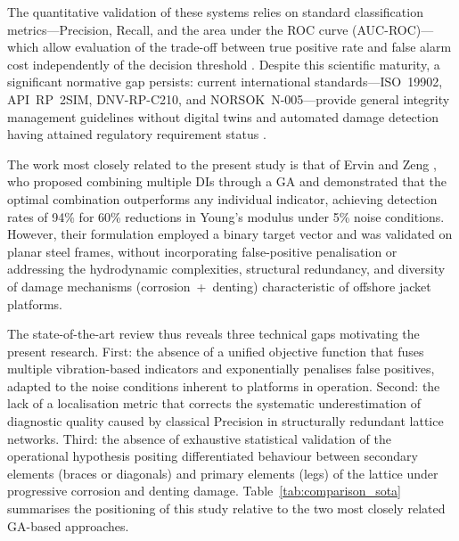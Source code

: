 \documentclass[preprint,12pt]{elsarticle}
\begin{document}
The quantitative validation of these systems relies on standard classification metrics---Precision, Recall, and the area under the ROC curve (AUC-ROC)---which allow evaluation of the trade-off between true positive rate and false alarm cost independently of the decision threshold \citep{li2024reliability}. Despite this scientific maturity, a significant normative gap persists: current international standards---ISO~19902, API~RP~2SIM, DNV-RP-C210, and NORSOK~N-005---provide general integrity management guidelines without digital twins and automated damage detection having attained regulatory requirement status \citep{ramboll2022digital}.

The work most closely related to the present study is that of Ervin and Zeng \citep{ervin2022index}, who proposed combining multiple DIs through a GA and demonstrated that the optimal combination outperforms any individual indicator, achieving detection rates of 94\% for 60\% reductions in Young's modulus under 5\% noise conditions. However, their formulation employed a binary target vector and was validated on planar steel frames, without incorporating false-positive penalisation or addressing the hydrodynamic complexities, structural redundancy, and diversity of damage mechanisms (corrosion~+~denting) characteristic of offshore jacket platforms.

The state-of-the-art review thus reveals three technical gaps motivating the present research. First: the absence of a unified objective function that fuses multiple vibration-based indicators and exponentially penalises false positives, adapted to the noise conditions inherent to platforms in operation. Second: the lack of a localisation metric that corrects the systematic underestimation of diagnostic quality caused by classical Precision in structurally redundant lattice networks. Third: the absence of exhaustive statistical validation of the operational hypothesis positing differentiated behaviour between secondary elements (braces or diagonals) and primary elements (legs) of the lattice under progressive corrosion and denting damage. Table~\ref{tab:comparison_sota} summarises the positioning of this study relative to the two most closely related GA-based approaches.
\end{document}
